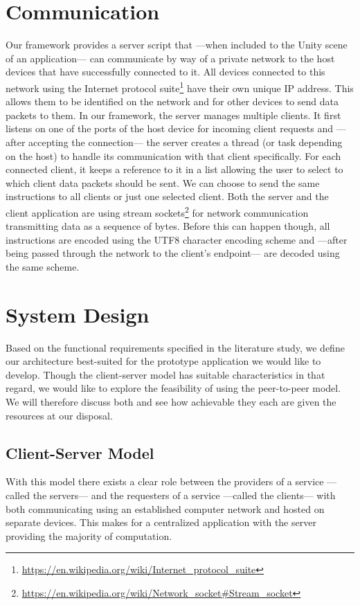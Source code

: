 \section{Communication}
Our framework provides a server script that ---when included to the Unity scene of an application--- can communicate by way of a private network to the host devices that have successfully connected to it. All devices connected to this network using the Internet protocol suite\footnote{\protect\url{https://en.wikipedia.org/wiki/Internet_protocol_suite}} have their own unique IP address. This allows them to be identified on the network and for other devices to send data packets to them. In our framework, the server manages multiple clients. It first listens on one of the ports of the host device for incoming client requests and ---after accepting the connection--- the server creates a thread (or task depending on the host) to handle its communication with that client specifically. For each connected client, it keeps a reference to it in a list allowing the user to select to which client data packets should be sent. We can choose to send the same instructions to all clients or just one selected client.
Both the server and the client application are using stream sockets\footnote{\protect\url{https://en.wikipedia.org/wiki/Network_socket\#Stream_socket}} for network communication transmitting data as a sequence of bytes. Before this can happen though, all instructions are encoded using the UTF8 character encoding scheme and ---after being passed through the network to the client's endpoint--- are decoded using the same scheme. 

\section{System Design}
Based on the functional requirements specified in the literature study, we define our architecture best-suited for the prototype application we would like to develop. Though the client-server model has suitable characteristics in that regard, we would like to explore the feasibility of using the peer-to-peer model. We will therefore discuss both and see how achievable they each are given the resources at our disposal.

\subsection{Client-Server Model}
With this model there exists a clear role between the providers of a service ---called the servers--- and the requesters of a service ---called the clients--- with both communicating using an established computer network and hosted on separate devices. This makes for a centralized application with the server providing the majority of computation. 

